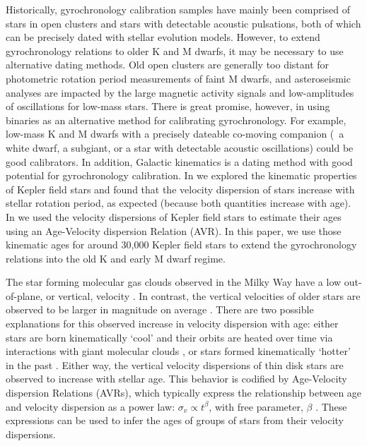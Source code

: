 Historically, gyrochronology calibration samples have mainly been comprised of
stars in open clusters and stars with detectable acoustic pulsations, both of
which can be precisely dated with stellar evolution models.
However, to extend gyrochronology relations to older K and M dwarfs, it may be
necessary to use alternative dating methods.
Old open clusters are generally too distant for photometric rotation period
measurements of faint M dwarfs, and asteroseismic analyses are impacted by the
large magnetic activity signals and low-amplitudes of oscillations for
low-mass stars.
There is great promise, however, in using binaries as an alternative method
for calibrating gyrochronology.
For example, low-mass K and M dwarfs with a precisely dateable co-moving
companion (\eg\ a white dwarf, a subgiant, or a star with detectable acoustic
oscillations) could be good calibrators.
In addition, Galactic kinematics is a dating method with good potential for
gyrochronology calibration.
In \citet{angus2020} we explored the kinematic properties of Kepler field
stars and found that the velocity dispersion of stars increase with stellar
rotation period, as expected (because both quantities increase with age).
In \citet{lu2021} we used the velocity dispersions of Kepler field stars to
estimate their ages using an Age-Velocity dispersion Relation (AVR).
In this paper, we use those kinematic ages for around 30,000 Kepler field
stars to extend the gyrochronology relations into the old K and early M dwarf
regime.

The star forming molecular gas clouds observed in the Milky Way have a low
out-of-plane, or vertical, velocity \citep[\eg][]{stark1989, stark2005,
aumer2009, martig2014, aumer2016}.
In contrast, the vertical velocities of older stars are observed to be larger
in magnitude on average \citep{stromberg1946, wielen1977, nordstrom2004,
holmberg2007, holmberg2009, aumer2009, casagrande2011, ting2019, yu2018}.
There are two possible explanations for this observed increase in velocity
dispersion with age: either stars are born kinematically `cool' and their
orbits are heated over time via interactions with giant molecular clouds
\citep[see][for a review of secular evolution in the MW]{sellwood2014}, or
stars formed kinematically `hotter' in the past \citep[\eg][]{bird2013}.
Either way, the vertical velocity dispersions of thin disk stars are observed
to increase with stellar age.
This behavior is codified by Age-Velocity dispersion Relations (AVRs), which
typically express the relationship between age and velocity dispersion as a
power law: $\sigma_v \propto t^\beta$, with free parameter, $\beta$
\citep[\eg][]{holmberg2009, yu2018}.
These expressions can be used to infer the ages of groups of stars from their
velocity dispersions.

